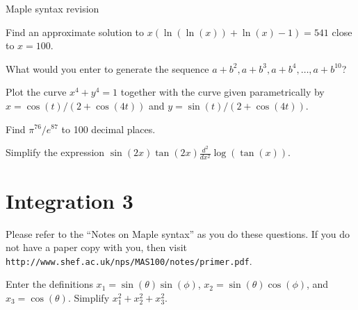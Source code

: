 \documentclass[a4paper,10pt]{amsbook}
\numberwithin{example}{chapter}
\begin{document}
\begin{center}
 {\huge Maple syntax revision}
\end{center}

\begin{exercise}
 Find an approximate solution to
 $x(\ln(\ln(x))+\ln(x)-1)=541$ close to $x=100$. 
\end{exercise}

\begin{exercise}
 What would you enter to generate the sequence
 $a+b^2,a+b^3,a+b^4,\dotsc,a+b^{10}$? 
\end{exercise}


\begin{exercise}
 Plot the curve $x^4+y^4=1$ together with the curve given
 parametrically by $x=\cos(t)/(2+\cos(4t))$ and
 $y=\sin(t)/(2+\cos(4t))$. 
\end{exercise}

\begin{exercise}
 Find $\pi^{76}/e^{87}$ to 100 decimal places.
\end{exercise}

\begin{exercise}
 Simplify the expression
 $\displaystyle \sin(2x)\tan(2x)\frac{d^2}{dx^2}\log(\tan(x))$.
\end{exercise}


\chapter{Integration 3}

Please refer to the ``Notes on Maple syntax'' as you do
these questions.  If you do not have a paper copy with you,
then visit
\verb~http://www.shef.ac.uk/nps/MAS100/notes/primer.pdf~. 

\begin{exercise}
 Enter the definitions $x_1=\sin(\theta)\sin(\phi)$,
 $x_2=\sin(\theta)\cos(\phi)$, and $x_3=\cos(\theta)$.
 Simplify $x_1^2+x_2^2+x_3^2$.
\end{exercise}
\end{document}
